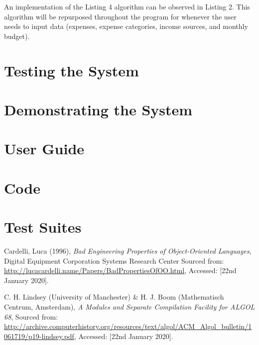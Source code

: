 \documentclass[12pt]{article}
\begin{document}
    An implementation of the Listing 4 algorithm can be observed in Listing 2.
    This algorithm will be repurposed throughout the program for whenever the user needs to input data (expenses, expense categories, income sources, and monthly budget).

  \section{Testing the System}
  \section{Demonstrating the System}

  \appendix
  \section{User Guide}
  \section{Code}
  \section{Test Suites}

  \begin{thebibliography}{9}
    Cardelli, Luca (1996),
    \textit{Bad Engineering Properties of Object-Oriented Languages},
    Digital Equipment Corporation Systems Research Center
    Sourced from: \url{http://lucacardelli.name/Papers/BadPropertiesOfOO.html},
    Accessed: [22nd January 2020].

    C. H. Lindsey (University of Manchester) \&
    H. J. Boom (Mathematisch Centrum, Amsterdam),
    \textit{A Modules and Separate Compilation Facility for ALGOL 68},
    Sourced from: \url{http://archive.computerhistory.org/resources/text/algol/ACM_Algol_bulletin/1061719/p19-lindsey.pdf},
    Accessed: [22nd January 2020].


  \end{thebibliography}
\end{document}
